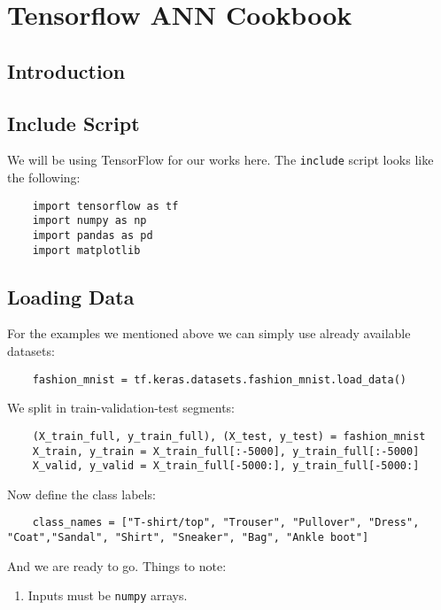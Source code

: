 \chapter{Tensorflow ANN Cookbook}

\section{Introduction}

\section{Include Script}
We will be using TensorFlow for our works here. The \verb|include| script looks like the following:
\begin{lstlisting}
    import tensorflow as tf
    import numpy as np
    import pandas as pd
    import matplotlib
\end{lstlisting}

\section{Loading Data}
For the examples we mentioned above we can simply use already available datasets:
\begin{lstlisting}
    fashion_mnist = tf.keras.datasets.fashion_mnist.load_data()
\end{lstlisting}
We split in train-validation-test segments:
\begin{lstlisting}
    (X_train_full, y_train_full), (X_test, y_test) = fashion_mnist
    X_train, y_train = X_train_full[:-5000], y_train_full[:-5000]
    X_valid, y_valid = X_train_full[-5000:], y_train_full[-5000:]
\end{lstlisting}
Now define the class labels:
\begin{lstlisting}
    class_names = ["T-shirt/top", "Trouser", "Pullover", "Dress", "Coat","Sandal", "Shirt", "Sneaker", "Bag", "Ankle boot"]
\end{lstlisting}
And we are ready to go. Things to note:
\begin{enumerate}
    \item Inputs must be \verb|numpy| arrays.
\end{enumerate}